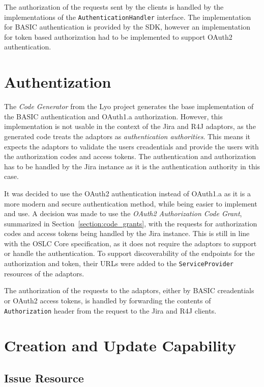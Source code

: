 The authorization of the requests sent by the clients is handled by the implementations of the \texttt{AuthenticationHandler} interface. The implementation for BASIC authentication is provided by the SDK, however an implementation for token based authorization had to be implemented to support OAuth2 authentication.

\section{Authentization}
The \emph{Code Generator} from the Lyo project generates the base implementation of the BASIC authentication and OAuth1.a authorization. However, this implementation is not usable in the context of the Jira and R4J adaptors, as the generated code treats the adaptors as \emph{authentication authorities}. This means it expects the adaptors to validate the users creadentials and provide the users with the authorization codes and access tokens. The authentication and authorization has to be handled by the Jira instance as it is the authentication authority in this case. 

It was decided to use the OAuth2 authentication instead of OAuth1.a as it is a more modern and secure authentication method, while being easier to implement and use. A decision was made to use the \emph{OAuth2 Authorization Code Grant}, summarized in Section \ref{section:code_grants}, with the requests for authorization codes and access tokens being handled by the Jira instance. This is still in line with the OSLC Core specification, as it does not require the adaptors to support or handle the authentication. To support discoverability of the endpoints for the authorization and token, their URLs were added to the \texttt{ServiceProvider} resources of the adaptors.

The authorization of the requests to the adaptors, either by BASIC creadentials or OAuth2 access tokens, is handled by forwarding the contents of \texttt{Authorization} header from the request to the Jira and R4J clients.

\section{Creation and Update Capability}

\subsection*{Issue Resource}

